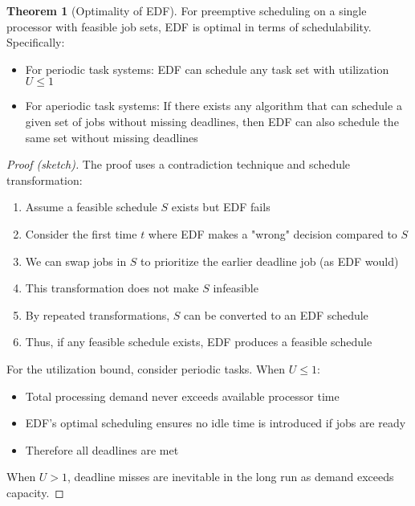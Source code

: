 \documentclass{article}
\theoremstyle{definition}
\newtheorem{theorem}{Theorem}
\begin{document}
\begin{theorem}[Optimality of EDF]
For preemptive scheduling on a single processor with feasible job sets, EDF is optimal in terms of schedulability. Specifically:

\begin{itemize}
    \item For periodic task systems: EDF can schedule any task set with utilization $U \leq 1$
    \item For aperiodic task systems: If there exists any algorithm that can schedule a given set of jobs without missing deadlines, then EDF can also schedule the same set without missing deadlines
\end{itemize}

\begin{proof}[Proof (sketch)]
The proof uses a contradiction technique and schedule transformation:

\begin{enumerate}
    \item Assume a feasible schedule $S$ exists but EDF fails
    \item Consider the first time $t$ where EDF makes a "wrong" decision compared to $S$
    \item We can swap jobs in $S$ to prioritize the earlier deadline job (as EDF would)
    \item This transformation does not make $S$ infeasible
    \item By repeated transformations, $S$ can be converted to an EDF schedule
    \item Thus, if any feasible schedule exists, EDF produces a feasible schedule
\end{enumerate}

For the utilization bound, consider periodic tasks. When $U \leq 1$:
\begin{itemize}
    \item Total processing demand never exceeds available processor time
    \item EDF's optimal scheduling ensures no idle time is introduced if jobs are ready
    \item Therefore all deadlines are met
\end{itemize}

When $U > 1$, deadline misses are inevitable in the long run as demand exceeds capacity.
\end{proof}
\end{theorem}
\end{document}
